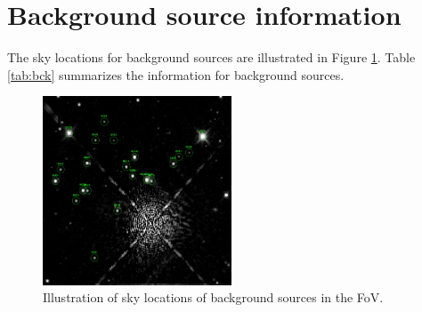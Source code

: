 \documentclass[twocolumn]{aastex62}
\begin{document}

\appendix
\section{Background source information}

The sky locations for background sources are illustrated in Figure \ref{fig:bck}. Table \ref{tab:bck} summarizes the information for background sources.

\begin{figure}[h]
  \centering
  \includegraphics[width=0.5\textwidth]{figures/backSourceLabeled.png}
  \caption{Illustration of sky locations of background sources in the FoV.}
  \label{fig:bck}
\end{figure}
\end{document}

